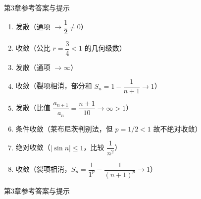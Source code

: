 \documentclass[aspectratio=169,10pt,fontset=fandol]{ctexbeamer}
\begin{document}
\begin{frame}[t,fragile]{第3章参考答案与提示}
\normalsize
{\normalsize
\begin{enumerate}

\item 发散（通项 \(\to \dfrac12 \neq 0\)）

\item 收敛（公比 \(r = \dfrac34 < 1\) 的几何级数）

\item 发散（通项 \(\to \infty\)）

\item 收敛（裂项相消，部分和 \(S_n = 1 - \dfrac{1}{n+1} \to 1\)）

\item 发散（比值 \(\dfrac{a_{n+1}}{a_n} = \dfrac{n+1}{10} \to \infty > 1\)）

\item 条件收敛（莱布尼茨判别法，但 \(p=1/2 < 1\) 故不绝对收敛）

\item 绝对收敛（\(|\sin n| \leq 1\)，比较 \(\dfrac{1}{n^2}\)）

\item 收敛（裂项相消，\(S_n = \dfrac{1}{1^p} - \dfrac{1}{(n+1)^p} \to 1\)）

\end{enumerate}
}
\end{frame}
\begin{frame}[t,fragile]{第3章参考答案与提示}
\normalsize
{\normalsize




\fi




}
\end{frame}
\end{document}
